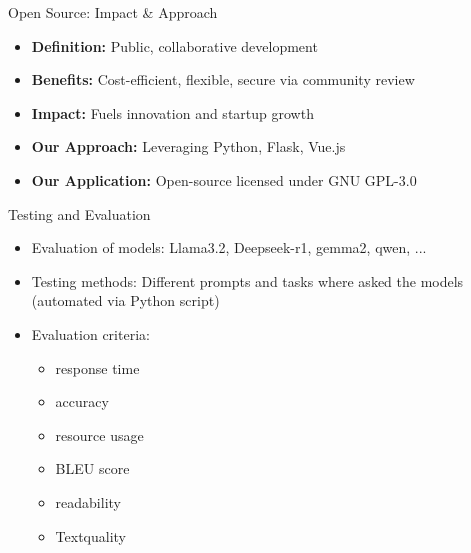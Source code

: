 \documentclass{beamer}
\begin{document}
\begin{frame}{Open Source: Impact \& Approach}
  \begin{itemize}
    \item \textbf{Definition:} Public, collaborative development
    \item \textbf{Benefits:} Cost-efficient, flexible, secure via community review
    \item \textbf{Impact:} Fuels innovation and startup growth
    \item \textbf{Our Approach:} Leveraging Python, Flask, Vue.js 
    \item \textbf{Our Application:} Open-source licensed under GNU GPL-3.0
  \end{itemize}
\end{frame}

  

\begin{frame}{Testing and Evaluation}
  \begin{itemize}
    \item Evaluation of models: Llama3.2, Deepseek-r1, gemma2, qwen, ...
    \item Testing methods: Different prompts and tasks where asked the models (automated via Python script)
    \item Evaluation criteria: 
      \begin{itemize}
        \item response time
        \item accuracy
        \item resource usage
        \item BLEU score
        \item readability
        \item Textquality
      \end{itemize}
  \end{itemize}
\end{frame}
\end{document}
